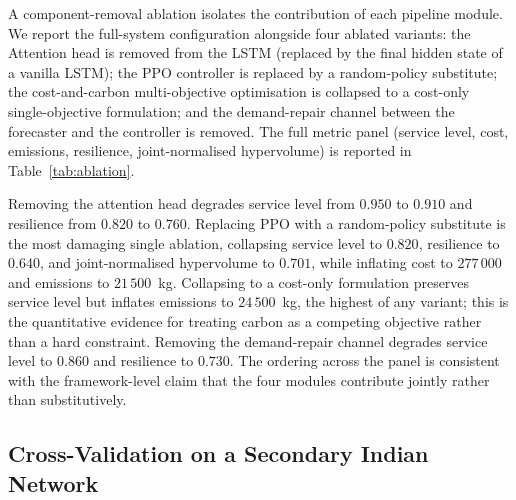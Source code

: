 \documentclass[review,preprint,authoryear,12pt]{elsarticle}
\begin{document}
A component-removal ablation isolates the contribution of each
pipeline module. We report the full-system configuration alongside
four ablated variants: the Attention head is removed from the LSTM
(replaced by the final hidden state of a vanilla LSTM); the PPO
controller is replaced by a random-policy substitute; the
cost-and-carbon multi-objective optimisation is collapsed to a
cost-only single-objective formulation; and the demand-repair channel
between the forecaster and the controller is removed. The full metric
panel (service level, cost, emissions, resilience, joint-normalised
hypervolume) is reported in Table~\ref{tab:ablation}.

Removing the attention head degrades service level from $0.950$ to
$0.910$ and resilience from $0.820$ to $0.760$. Replacing PPO with a
random-policy substitute is the most damaging single ablation,
collapsing service level to $0.820$, resilience to $0.640$, and
joint-normalised hypervolume to $0.701$, while inflating cost to
$277\,000$ and emissions to $21\,500$~kg. Collapsing to a cost-only
formulation preserves service level but inflates emissions to
$24\,500$~kg, the highest of any variant; this is the quantitative
evidence for treating carbon as a competing objective rather than a
hard constraint. Removing the demand-repair channel degrades service
level to $0.860$ and resilience to $0.730$. The ordering across the
panel is consistent with the framework-level claim that the four
modules contribute jointly rather than substitutively.

\begin{table}[H]
\centering
\caption{Component-removal ablation: service level, cost, emissions,
resilience, and joint-normalised hypervolume for the full system and
four ablated variants.}
\label{tab:ablation}

\end{table}

\subsection{Cross-Validation on a Secondary Indian Network}
\label{sec:experiments:secondary}
\end{document}
